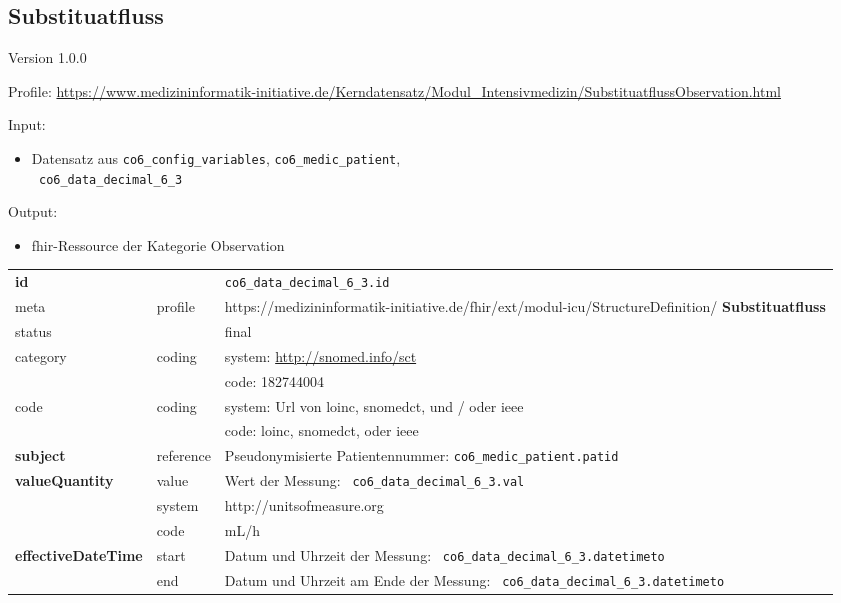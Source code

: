 \subsection{Substituatfluss} 
\noindent Version 1.0.0

\noindent Profile: \url{https://www.medizininformatik-initiative.de/Kerndatensatz/Modul_Intensivmedizin/SubstituatflussObservation.html}

\noindent Input:
\begin{itemize}
	\item Datensatz aus \texttt{co6\_config\_variables}, \texttt{co6\_medic\_patient}, \\ \texttt{
co6\_data\_decimal\_6\_3}
\end{itemize}
Output:
\begin{itemize}
        \item \ac{fhir}-Ressource der Kategorie \glqq Observation\grqq{}
\end{itemize}
\begin{longtable}{|l|l|p{7.5cm}|}
        \hline
        \rowcolor{lightgray} \multicolumn{3}{|l|}{Data Mapping (inhaltlich)} \\ \hline
        \textbf{id} &  & \texttt{co6\_data\_decimal\_6\_3.id} \\ \hline
	meta & profile & https://medizininformatik-initiative.de/fhir/ext/modul-icu/StructureDefinition/\textbf{
Substituatfluss} \\ \hline 
	status &  & final   \\ \hline 
	category & coding & system: \url{http://snomed.info/sct} \\
\cline{3-3}
	& & code: 182744004 \\ \hline
	code & coding & system: Url von \ac{loinc}, \ac{snomedct}, und / oder \ac{ieee} \\ 
	\cline{3-3} 
	 &  & code: \ac{loinc}, \ac{snomedct}, oder \ac{ieee} \\ \hline
	 \textbf{subject}  & reference & Pseudonymisierte Patientennummer: \texttt{co6\_medic\_patient.patid} \\ \hline
	 \textbf{valueQuantity}  & value & Wert der Messung: \texttt{
co6\_data\_decimal\_6\_3.val} \\
        \cline{2-3}
         & system & http://unitsofmeasure.org \\
         \cline{2-3}
         & code & mL/h \\ \hline
     \textbf{effectiveDateTime}  & start & Datum und Uhrzeit der Messung: \texttt{
co6\_data\_decimal\_6\_3.datetimeto} \\
    \cline{2-3}
     & end & Datum und Uhrzeit am Ende der Messung: \texttt{
co6\_data\_decimal\_6\_3.datetimeto} \\ \hline
\end{longtable}



